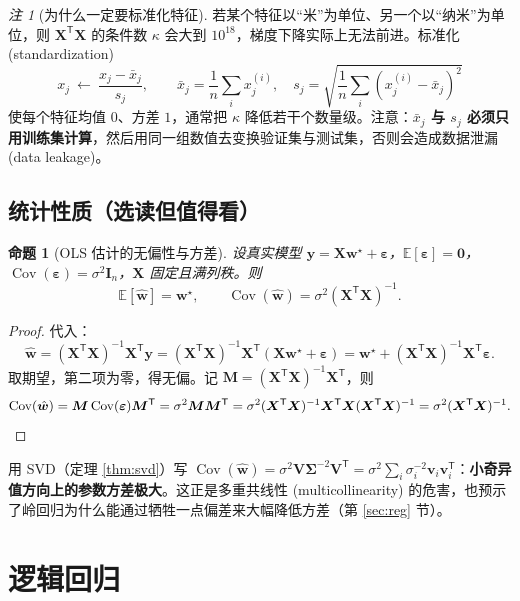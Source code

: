 \documentclass[UTF8,a4paper,11pt]{ctexart}
\theoremstyle{definition}
\theoremstyle{plain}
\newtheorem{proposition}[definition]{命题}
\theoremstyle{remark}
\newtheorem{remark}[definition]{注}
\DeclareMathOperator{\Cov}{Cov}
\newcommand{\E}{\mathbb{E}}
\newcommand{\T}{^{\mathsf{T}}}
\newcommand{\eng}[1]{\textup{(#1)}}
\begin{document}
\begin{remark}[为什么一定要标准化特征]\label{rmk:standardize}
若某个特征以“米”为单位、另一个以“纳米”为单位，则 $\bm{X}\T\bm{X}$ 的条件数 $\kappa$ 会大到 $10^{18}$，梯度下降实际上无法前进。标准化 \eng{standardization}
\[
  x_j\ \longleftarrow\ \frac{x_j-\bar x_j}{s_j},\qquad
  \bar x_j=\frac1n\sum_i x^{(i)}_j,\quad s_j=\sqrt{\frac1n\sum_i(x^{(i)}_j-\bar x_j)^2}
\]
使每个特征均值 $0$、方差 $1$，通常把 $\kappa$ 降低若干个数量级。注意：\textbf{$\bar x_j$ 与 $s_j$ 必须只用训练集计算}，然后用同一组数值去变换验证集与测试集，否则会造成数据泄漏 \eng{data leakage}。
\end{remark}

\subsection{统计性质（选读但值得看）}

\begin{proposition}[OLS 估计的无偏性与方差]\label{prop:ols-stat}
设真实模型 $\bm{y}=\bm{X}\bm{w}^\star+\bm{\varepsilon}$，$\E[\bm{\varepsilon}]=\bm{0}$，$\Cov(\bm{\varepsilon})=\sigma^2\bm{I}_n$，$\bm{X}$ 固定且满列秩。则
\[
  \E[\hat{\bm{w}}]=\bm{w}^\star,\qquad
  \Cov(\hat{\bm{w}})=\sigma^2(\bm{X}\T\bm{X})^{-1}.
\]
\end{proposition}

\begin{proof}
代入：
\[
  \hat{\bm{w}}=(\bm{X}\T\bm{X})^{-1}\bm{X}\T\bm{y}
  =(\bm{X}\T\bm{X})^{-1}\bm{X}\T(\bm{X}\bm{w}^\star+\bm{\varepsilon})
  =\bm{w}^\star+(\bm{X}\T\bm{X})^{-1}\bm{X}\T\bm{\varepsilon}.
\]
取期望，第二项为零，得无偏。记 $\bm{M}=(\bm{X}\T\bm{X})^{-1}\bm{X}\T$，则
\[
  \Cov(\hat{\bm{w}})=\bm{M}\Cov(\bm{\varepsilon})\bm{M}\T=\sigma^2\bm{M}\bm{M}\T
  =\sigma^2(\bm{X}\T\bm{X})^{-1}\bm{X}\T\bm{X}(\bm{X}\T\bm{X})^{-1}=\sigma^2(\bm{X}\T\bm{X})^{-1}. \qedhere
\]
\end{proof}

用 SVD（定理 \ref{thm:svd}）写 $\Cov(\hat{\bm{w}})=\sigma^2\bm{V}\bm{\Sigma}^{-2}\bm{V}\T=\sigma^2\sum_i\sigma_i^{-2}\bm{v}_i\bm{v}_i\T$：\textbf{小奇异值方向上的参数方差极大}。这正是多重共线性 \eng{multicollinearity} 的危害，也预示了岭回归为什么能通过牺牲一点偏差来大幅降低方差（第 \ref{sec:reg} 节）。

\section{逻辑回归}\label{sec:logistic}
\end{document}
